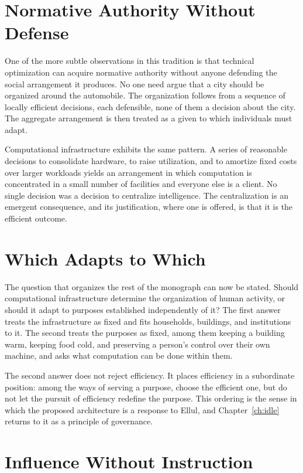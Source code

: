 \section{Normative Authority Without Defense}

One of the more subtle observations in this tradition is that technical optimization can acquire normative authority without anyone defending the social arrangement it produces. No one need argue that a city should be organized around the automobile. The organization follows from a sequence of locally efficient decisions, each defensible, none of them a decision about the city. The aggregate arrangement is then treated as a given to which individuals must adapt.

Computational infrastructure exhibits the same pattern. A series of reasonable decisions to consolidate hardware, to raise utilization, and to amortize fixed costs over larger workloads yields an arrangement in which computation is concentrated in a small number of facilities and everyone else is a client. No single decision was a decision to centralize intelligence. The centralization is an emergent consequence, and its justification, where one is offered, is that it is the efficient outcome.

\section{Which Adapts to Which}

The question that organizes the rest of the monograph can now be stated. Should computational infrastructure determine the organization of human activity, or should it adapt to purposes established independently of it? The first answer treats the infrastructure as fixed and fits households, buildings, and institutions to it. The second treats the purposes as fixed, among them keeping a building warm, keeping food cold, and preserving a person's control over their own machine, and asks what computation can be done within them.

The second answer does not reject efficiency. It places efficiency in a subordinate position: among the ways of serving a purpose, choose the efficient one, but do not let the pursuit of efficiency redefine the purpose. This ordering is the sense in which the proposed architecture is a response to Ellul, and Chapter~\ref{ch:idle} returns to it as a principle of governance.

\section{Influence Without Instruction}

